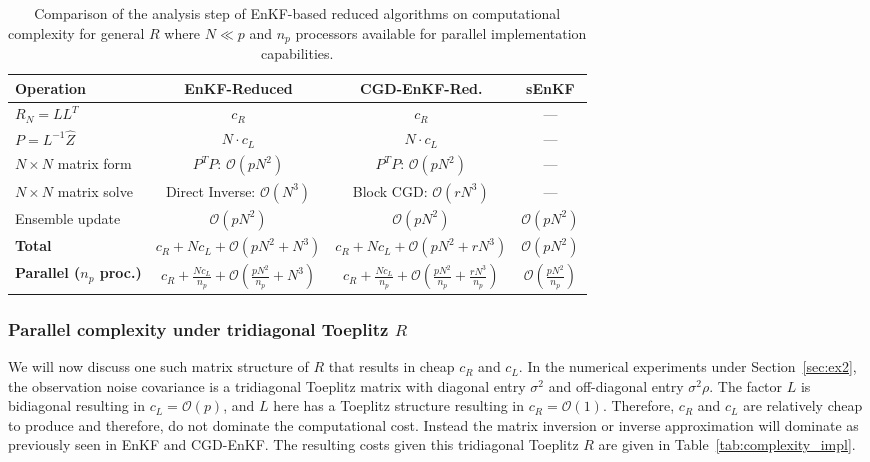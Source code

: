 \documentclass[11p]{elsarticle}
\numberwithin{equation}{section}
\begin{document}
  \begin{table}[ht]
  \centering
  \footnotesize 
  \caption{Comparison of the analysis step of EnKF-based reduced algorithms on computational complexity for general $R$ where $N \ll p$ and $n_p$ processors available for parallel implementation capabilities.}
  \label{tab:complexity_general}
  \begin{tabular}{l ccc}
  \hline
  \textbf{Operation}
    & \textbf{EnKF-Reduced}
    & \textbf{CGD-EnKF-Red.}
    & \textbf{sEnKF} \\
  \hline
  $R_N\!=\!LL^T$
    & $c_R$
    & $c_R$
    & --- \\
  $P\!=\!L^{-1}\widehat{Z}$
    & $N \cdot c_L$
    & $N \cdot c_L$
    & --- \\
  $N\!\times\!N$ matrix form
    & $P^TP$: $\mathcal{O}(pN^2)$
    & $P^TP$: $\mathcal{O}(pN^2)$
    & --- \\
  $N\!\times\!N$ matrix solve
    &  Direct Inverse: $\mathcal{O}(N^3)$
    & Block CGD: $\mathcal{O}(rN^3)$
    & --- \\
  Ensemble update
    & $\mathcal{O}(pN^2)$
    & $\mathcal{O}(pN^2)$
    & $\mathcal{O}(pN^2)$ \\
  \hline
  \textbf{Total}
    & $c_R\!+\!Nc_L\!+\!\mathcal{O}(pN^2\!+\!N^3)$
    & $c_R\!+\!Nc_L\!+\!\mathcal{O}(pN^2\!+\!rN^3)$
    & $\mathcal{O}(pN^2)$ \\
  \textbf{Parallel ($n_p$ proc.)}
    & $c_R\!+\!\frac{Nc_L}{n_p}\!+\!\mathcal{O}(\frac{pN^2}{n_p}\!+\!N^3)$
    & $c_R\!+\!\frac{Nc_L}{n_p}\!+\!\mathcal{O}(\frac{pN^2}{n_p}\!+\!\frac{rN^3}{n_p})$
    & $\mathcal{O}(\frac{pN^2}{n_p})$ \\
  \hline

  \end{tabular}
  \end{table}

  \subsubsection{Parallel complexity under tridiagonal Toeplitz $R$}
    We will now discuss one such matrix structure of $R$ that results in cheap $c_R$ and $c_L$.  In the numerical experiments under Section~\ref{sec:ex2}, the observation noise covariance is a tridiagonal Toeplitz matrix with diagonal entry $\sigma^2$ and off-diagonal entry
  $\sigma^2\rho$.  The factor $L$ is bidiagonal resulting in
  $c_L = \mathcal{O}(p)$, and $L$ here has a Toeplitz structure resulting in $c_R = \mathcal{O}(1)$. %
  Therefore, $c_R$ and $c_L$ are relatively cheap to produce and therefore, do not dominate the computational cost.  Instead the matrix inversion or inverse approximation will dominate as previously seen in EnKF and CGD-EnKF.  The resulting costs given this tridiagonal Toeplitz $R$ are given in Table~\ref{tab:complexity_impl}.
\end{document}
